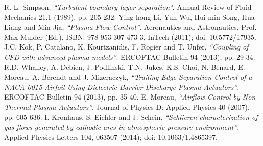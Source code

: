 \documentclass[10pt,a4paper]{article}
\begin{document}
\begin{thebibliography}{99}

	R. L. Simpson, \emph{``Turbulent boundary-layer separation"}. Annual Review of Fluid Mechanics 21.1 (1989), pp. 205-232.‏
	Ying-hong Li, Yun Wu, Hui-min Song, Hua Liang and Min Jia, \emph{``Plasma Flow Control''}. Aeronautics and Astronautics, Prof. Max Mulder (Ed.), ISBN: 978-953-307-473-3, InTech (2011); doi: 10.5772/17935. 
	J.C. Kok, P. Catalano, K. Kourtzanidis, F. Rogier and T. Unfer, \emph{``Coupling of CFD with advanced plasma models''}. ERCOFTAC Bulletin 94 (2013), pp. 29-34.
	R.D. Whalley, A. Debien, J. Podlinski, T.N. Jukes, K.S. Choi, N. Benard, E. Moreau, A. Berendt and J. Mizeraczyk, \emph{``Trailing-Edge Separation Control of a NACA 0015 Airfoil Using Dielectric-Barrier-Discharge Plasma Actuators''}. ERCOFTAC Bulletin 94 (2013), pp. 35-40.
	E. Moreau, \emph{ ``Airflow Control by Non-Thermal Plasma Actuators''}. Journal of Physics D: Applied Physics 40 (2007), pp. 605-636.
	I. Kronhaus, S. Eichler and J. Schein,
	\emph{``Schlieren characterization of gas flows generated by cathodic arcs in atmospheric pressure environment”}. Applied Physics Letters 104, 063507 (2014); doi: 10.1063/1.4865397.
  

\end{thebibliography}
\end{document}
